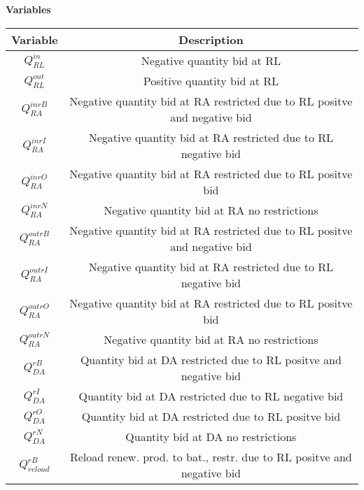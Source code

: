 \textbf{Variables}
\begin{table}[H]
	\centering
	\begin{tabular}{c|c}
		\textbf{Variable} & \textbf{Description}                                                                        \\
		\hline
		$Q^{in}_{RL}$     & Negative quantity bid at RL                                                                 \\
		$Q^{out}_{RL}$    & Positive quantity bid at RL                                                                 \\
		$Q^{inrB}_{RA}$   & Negative quantity bid at RA restricted due to RL positve and negative bid                   \\
		$Q^{inrI}_{RA}$   & Negative quantity bid at RA restricted due to RL negative bid                               \\
		$Q^{inrO}_{RA}$   & Negative quantity bid at RA restricted due to RL positve bid                                \\
		$Q^{inrN}_{RA}$   & Negative quantity bid at RA no restrictions                                                 \\
		$Q^{outrB}_{RA}$  & Negative quantity bid at RA restricted due to RL positve and negative bid                   \\
		$Q^{outrI}_{RA}$  & Negative quantity bid at RA restricted due to RL negative bid                               \\
		$Q^{outrO}_{RA}$  & Negative quantity bid at RA restricted due to RL positve bid                                \\
		$Q^{outrN}_{RA}$  & Negative quantity bid at RA no restrictions                                                 \\
		$Q^{rB}_{DA}$     & Quantity bid at DA restricted due to RL positve and negative bid                            \\
		$Q^{rI}_{DA}$     & Quantity bid at DA restricted due to RL negative bid                                        \\
		$Q^{rO}_{DA}$     & Quantity bid at DA restricted due to RL positve bid                                         \\
		$Q^{rN}_{DA}$     & Quantity bid at DA no restrictions                                                          \\
		$Q^{rB}_{reload}$ & Reload renew. prod. to bat., restr. due to RL positve and negative bid                      \\

\end{tabular}
\end{table}
